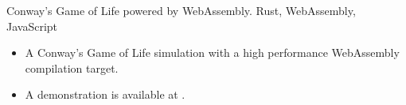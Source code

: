 \showoff
{}
{Conway's Game of Life powered by WebAssembly.}
{Rust, WebAssembly, JavaScript}
{}


\begin{itemize}[label=$\triangleright$]
    \item A Conway's Game of Life simulation with a high performance WebAssembly compilation target.
    \item A demonstration is available at .
\end{itemize}
